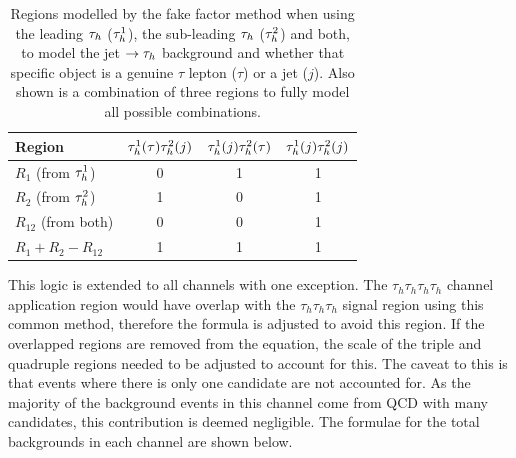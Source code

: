 \begin{table}[H]
\centering
\begin{tabular}{|l|ccc|}
\hline
Region    & $\tau_{h}^1 (\tau) \tau_{h}^2 (j)$ & $\tau_{h}^1 (j) \tau_{h}^2 (\tau)$ & $\tau_{h}^1 (j) \tau_{h}^2 (j)$ \\
\hline
\hline
$R_{1}$ (from $\tau_{h}^1$)     & 0                            & 1                            & 1                         \\
$R_{2}$ (from $\tau_{h}^2$)     & 1                            & 0                            & 1                         \\
$R_{12}$ (from both)         & 0                            & 0                            & 1                         \\
\hline
$R_{1} +R_{2} - R_{12}$      & 1                            & 1                            & 1       \\                  
\hline
\end{tabular}
\caption{Regions modelled by the fake factor method when using the leading $\tau_{h}$ ($\tau_{h}^1$), the sub-leading $\tau_{h}$ ($\tau_{h}^2$) and both, to model the jet $\rightarrow \tau_{h}$ background and whether that specific object is a genuine $\tau$ lepton ($\tau$) or a jet ($j$). Also shown is a combination of three regions to fully model all possible combinations. }
\label{tab:apply_ff}
\end{table}

This logic is extended to all channels with one exception.
The $\tau_h \tau_h \tau_h \tau_h$ channel application region would have overlap with the $\tau_h \tau_h \tau_h$ signal region using this common method, therefore the formula is adjusted to avoid this region.
If the overlapped regions are removed from the equation, the scale of the triple and quadruple regions needed to be adjusted to account for this.
The caveat to this is that events where there is only one \jtth candidate are not accounted for.
As the majority of the background events in this channel come from \ac{QCD} with many \jtth candidates, this contribution is deemed negligible.
The formulae for the total \jtth backgrounds in each channel are shown below. \\

